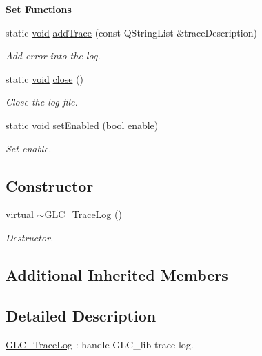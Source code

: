 \begin{Indent}{\bf Set Functions}\par
\begin{DoxyCompactItemize}
\item 
static \hyperlink{group___u_a_v_objects_plugin_ga444cf2ff3f0ecbe028adce838d373f5c}{void} \hyperlink{class_g_l_c___trace_log_af7b42cf5e61121931dbc3da4a3ce2f91}{add\-Trace} (const Q\-String\-List \&trace\-Description)
\begin{DoxyCompactList}\small\item\em Add error into the log. \end{DoxyCompactList}\item 
static \hyperlink{group___u_a_v_objects_plugin_ga444cf2ff3f0ecbe028adce838d373f5c}{void} \hyperlink{class_g_l_c___trace_log_a06934ce3a239bd5a291f00466666a77a}{close} ()
\begin{DoxyCompactList}\small\item\em Close the log file. \end{DoxyCompactList}\item 
static \hyperlink{group___u_a_v_objects_plugin_ga444cf2ff3f0ecbe028adce838d373f5c}{void} \hyperlink{class_g_l_c___trace_log_ac43f43e7173a1994607278bf8743231b}{set\-Enabled} (bool enable)
\begin{DoxyCompactList}\small\item\em Set enable. \end{DoxyCompactList}\end{DoxyCompactItemize}
\end{Indent}
\subsection*{Constructor}
\begin{DoxyCompactItemize}
\item 
virtual \hyperlink{class_g_l_c___trace_log_ab66bd24d800e0aba8927bb4aa936da23}{$\sim$\-G\-L\-C\-\_\-\-Trace\-Log} ()
\begin{DoxyCompactList}\small\item\em Destructor. \end{DoxyCompactList}\end{DoxyCompactItemize}
\subsection*{Additional Inherited Members}


\subsection{Detailed Description}
\hyperlink{class_g_l_c___trace_log}{G\-L\-C\-\_\-\-Trace\-Log} \-: handle G\-L\-C\-\_\-lib trace log. 


